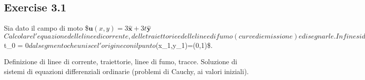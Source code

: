 \documentclass[letterpaper,10pt,italian]{jupyterBook}
\begin{document}
\subsection{Exercise 3.1}
\label{\detokenize{polimi/fluidmechanics-ita/template/capitoli/03_cinematica/1202in:exercise-3-1}}\label{\detokenize{polimi/fluidmechanics-ita/template/capitoli/03_cinematica/1202in:fluid-mechanics-kinematics-ex-01}}\label{\detokenize{polimi/fluidmechanics-ita/template/capitoli/03_cinematica/1202in::doc}}
\sphinxAtStartPar
Sia dato il campo di moto
\$\(\bm{u}(x,y) = 3 \bm{\hat{x}} + 3t \bm{\hat{y}}\)\( Calcolare l'equazione
delle linee di corrente, delle traiettorie e delle linee di fumo (curve
di emissione) e disegnarle. Infine si determino le tracce generate al
tempo \)t\_0 = 0\( dal segmento che unisce l'origine con il punto
\)(x\_1,y\_1)=(0,1)\$.

\sphinxAtStartPar
Definizione di linee di corrente, traiettorie, linee di fumo, tracce.
Soluzione di sistemi di equazioni differenziali ordinarie (problemi di
Cauchy, ai valori iniziali).
\end{document}
